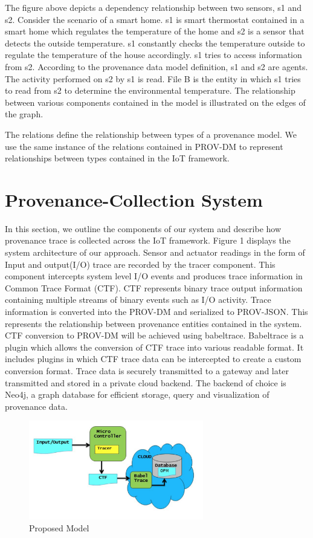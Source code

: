 The figure above depicts a dependency relationship between two sensors, s1 and s2. Consider the scenario of a smart home. s1 is smart thermostat contained in a smart home which regulates the temperature of the home and s2 is a sensor that detects the outside temperature. s1 constantly checks the temperature outside to regulate the temperature of the house accordingly. s1 tries to access information from s2. According to the provenance data model  definition, s1 and s2 are agents. The activity performed on s2 by s1 is read. File B is the entity in which s1 tries to read from s2 to determine the environmental temperature. The relationship between various components contained in the model is illustrated on the edges of the graph.

\par The relations define the relationship between types of a provenance model. We use the same instance of the relations contained in PROV-DM to represent relationships between types contained in the IoT framework.


\section{Provenance-Collection System}

In this section, we outline the components of our system and describe how provenance trace is collected across the IoT framework. Figure 1 displays the system architecture of our approach. Sensor and actuator readings in the form of Input and output(I/O) trace are recorded by the tracer component. This component intercepts system level I/O events and produces trace information in Common Trace Format (CTF). CTF represents binary trace output information containing multiple streams of binary events such as I/O activity. Trace information is converted into the PROV-DM and serialized to PROV-JSON. This represents the relationship between provenance entities contained in the system. CTF conversion to PROV-DM will be achieved using babeltrace. Babeltrace is a plugin which allows the conversion of CTF trace into various readable format. It includes plugins in which CTF trace data can be intercepted to create a custom conversion format. Trace data is securely transmitted to a gateway and later transmitted and stored in a private cloud backend. The backend of choice is Neo4j, a graph database for efficient storage, query and visualization of provenance data.


\begin{figure}[h]
\begin{center}

\includegraphics[width =3.0in]{architecture.PNG}    
\end{center}
\caption{Proposed Model}
\label{architecture}
\end{figure}

